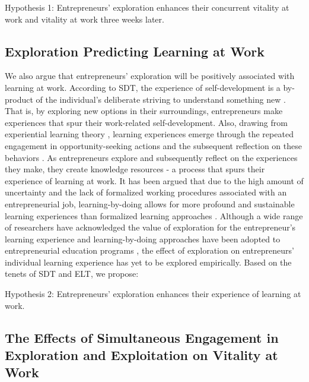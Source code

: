 \documentclass[man, 12pt, a4paper, noextraspace]{apa6}
\begin{document}
Hypothesis 1: Entrepreneurs' exploration enhances their concurrent vitality at work and vitality at work three weeks later. \par 

\subsection{Exploration Predicting Learning at Work}

We also argue that entrepreneurs' exploration will be positively associated with learning at work.
According to SDT, the experience of self-development is a by-product of the individual's deliberate striving to understand something new \parencite{Spreitzer.2005b}. 
That is, by exploring new options in their surroundings, entrepreneurs make experiences that spur their work-related self-development.  
Also, drawing from experiential learning theory \parencite[ELT;][]{Kolb2009}, learning experiences emerge through the repeated engagement in opportunity-seeking actions and the subsequent reflection on these behaviors \parencite{Holcomb2009}. 
As entrepreneurs explore and subsequently reflect on the experiences they make, they create knowledge resources - a process that spurs their experience of learning at work. 
It has been argued that due to the high amount of uncertainty and the lack of formalized working procedures associated with an entrepreneurial job, learning-by-doing allows for more profound and sustainable learning experiences than formalized learning approaches \parencite[e.g.,][]{Minniti.2001, Cope.2000, Chang2014}. 
Although a wide range of researchers have acknowledged the value of exploration for the entrepreneur's learning experience and learning-by-doing approaches have been adopted to entrepreneurial education programs \parencite[e.g.,][]{Chang2014, Pittaway2011, Daly2001}, the effect of exploration on entrepreneurs' individual learning experience has yet to be explored empirically. 
Based on the tenets of SDT and ELT, we propose: \par 

Hypothesis 2: Entrepreneurs' exploration enhances their experience of learning at work. \par 

\subsection{The Effects of Simultaneous Engagement in Exploration and Exploitation on Vitality at Work}
\end{document}
